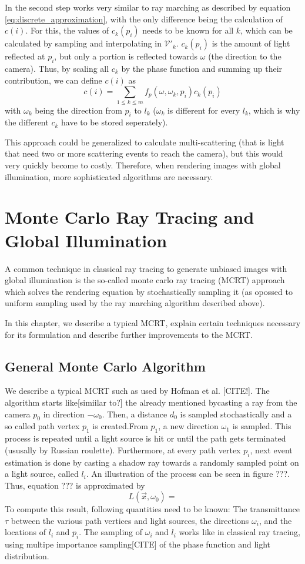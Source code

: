 In the second step works very similar to ray marching as described by equation \ref{eq:discrete_approximation}, with the only difference being the calculation of $c(i)$. For this, the values of $c_k(p_i)$ needs to be known for all $k$, which can be calculated by sampling and interpolating in $\mathcal{V'}_k$.
$c_k(p_i)$ is the amount of light reflected at $p_i$, but only a portion is reflected towards $\omega$ (the direction to the camera). Thus, by scaling all $c_k$ by the phase function and summing up their contribution, we can define $c(i)$ as
\begin{equation}
c(i) = \sum_{1 \le k \le m} f_p(\omega, \omega_k, p_i)c_k(p_i)
\end{equation}
with $\omega_k$ being the direction from $p_i$ to $l_k$ ($\omega_k$ is different for every $l_k$, which is why the different $c_k$ have to be stored seperately).

This approach could be generalized to calculate multi-scattering (that is light that need two or more scattering events to reach the camera), but this would very quickly become to costly. Therefore, when rendering images with global illumination, more sophisticated algorithms are necessary.
\section{Monte Carlo Ray Tracing and Global Illumination}
A common technique in classical ray tracing to generate unbiased images with global illumination is the so-called monte carlo ray tracing (MCRT) approach which solves the rendering equation by stochastically sampling it (as opossed to uniform sampling used by the ray marching algorithm described above).

In this chapter, we describe a typical MCRT, explain certain techniques necessary for its formulation and describe further improvements to the MCRT. 
\subsection{General Monte Carlo Algorithm}
We describe a typical MCRT such as used by Hofman et al. [CITE!].
The algorithm starts like[simiilar to?] the already mentioned bycasting a ray from the camera $p_0$ in direction $-\omega_0$. Then, a distance $d_0$ is sampled stochastically and a so called path vertex $p_1$ is created.From $p_1$, a new direction $\omega_1$ is sampled. This process is repeated until a light source is hit or until the path gets terminated (ususally by Russian roulette). Furthermore, at every path vertex $p_i$, next event estimation is done by casting a shadow ray towards a randomly sampled point on a light source, called $l_i$.
An illustration of the process can be seen in figure ???.
Thus, equation ??? is approximated by
\begin{equation}
L(\vec{x},\omega_0) = 
\end{equation}
To compute this result, following quantities need to be known: The transmittance $\tau$ between the various path vertices and light sources, the directions $\omega_i$, and the locations of $l_i$ and $p_i$.
The sampling of $\omega_i$ and $l_i$ works like in classical ray tracing, using multipe importance sampling[CITE] of the phase function and light distribution.

